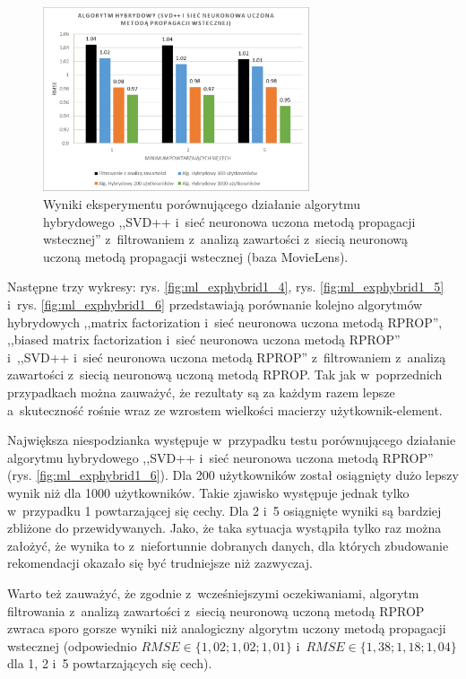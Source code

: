 \documentclass[twoside]{iisthesis}
\begin{document}
		\begin{figure}
			\centering
			\includegraphics[width=0.7\textwidth]{ml_exphybrid1_3}			
			\caption{Wyniki eksperymentu porównującego działanie algorytmu hybrydowego ,,SVD++ i~sieć neuronowa uczona metodą propagacji wstecznej'' z~filtrowaniem z~analizą zawartości z~siecią neuronową uczoną metodą propagacji wstecznej (baza MovieLens).}
			\label{fig:ml_exphybrid1_3}
		\end{figure}
		
		Następne trzy wykresy: rys. \ref{fig:ml_exphybrid1_4}, rys. \ref{fig:ml_exphybrid1_5} i~rys. \ref{fig:ml_exphybrid1_6} przedstawiają porównanie kolejno algorytmów hybrydowych ,,matrix factorization i~sieć neuronowa uczona metodą RPROP'', ,,biased matrix factorization i~sieć neuronowa uczona metodą RPROP'' i~,,SVD++ i~sieć neuronowa uczona metodą RPROP'' z~filtrowaniem z~analizą zawartości z~siecią neuronową uczoną metodą RPROP. Tak jak w~poprzednich przypadkach można zauważyć, że rezultaty są za każdym razem lepsze a~skuteczność rośnie wraz ze wzrostem wielkości macierzy użytkownik-element.
		
		Największa niespodzianka występuje w~przypadku testu porównującego działanie algorytmu hybrydowego ,,SVD++ i~sieć neuronowa uczona metodą RPROP'' (rys. \ref{fig:ml_exphybrid1_6}). Dla 200 użytkowników został osiągnięty dużo lepszy wynik niż dla 1000 użytkowników. Takie zjawisko występuje jednak tylko w~przypadku 1 powtarzającej się cechy. Dla 2 i~5 osiągnięte wyniki są bardziej zbliżone do przewidywanych. Jako, że taka sytuacja wystąpiła tylko raz można założyć, że wynika to z~niefortunnie dobranych danych, dla których zbudowanie rekomendacji okazało się być trudniejsze niż zazwyczaj. 
		
		Warto też zauważyć, że zgodnie z~wcześniejszymi oczekiwaniami, algorytm filtrowania z~analizą zawartości z~siecią neuronową uczoną metodą RPROP zwraca sporo gorsze wyniki niż analogiczny algorytm uczony metodą propagacji wstecznej (odpowiednio $RMSE \in \{1,02; 1,02; 1,01\}$ i~$RMSE \in \{1,38; 1,18; 1,04\}$ dla 1, 2 i~5 powtarzających się cech). 
		
\end{document}
